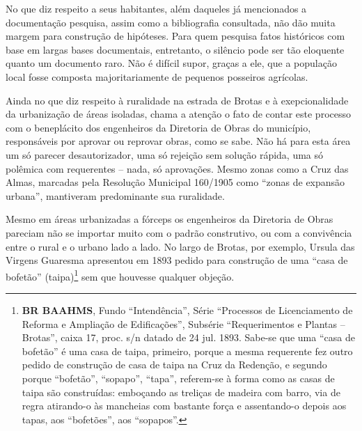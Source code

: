 
No que diz respeito a seus habitantes, além daqueles já mencionados a documentação pesquisa, assim como a bibliografia consultada, não dão muita margem para construção de hipóteses. Para quem pesquisa fatos históricos com base em largas bases documentais, entretanto, o silêncio pode ser tão eloquente quanto um documento raro. Não é difícil supor, graças a ele, que a população local fosse composta majoritariamente de pequenos posseiros agrícolas.


Ainda no que diz respeito à ruralidade na estrada de Brotas e à exepcionalidade da urbanização de áreas isoladas, chama a atenção o fato de contar este processo com o beneplácito dos engenheiros da Diretoria de Obras do município, responsáveis por aprovar ou reprovar obras, como se sabe. Não há para esta área um só parecer desautorizador, uma só rejeição sem solução rápida, uma só polêmica com requerentes -- nada, só aprovações. Mesmo zonas como a Cruz das Almas, marcadas pela Resolução Municipal 160/1905 como ``zonas de expansão urbana'', mantiveram predominante sua ruralidade.

Mesmo em áreas urbanizadas a fórceps os engenheiros da Diretoria de Obras pareciam não se importar muito com o padrão construtivo, ou com a convivência entre o rural e o urbano lado a lado. No largo de Brotas, por exemplo, Ursula das Virgens Guaresma apresentou em 1893 pedido para construção de uma ``casa de bofetão'' (taipa)\footnote{\textbf{BR BAAHMS}, Fundo ``Intendência'', Série ``Processos de Licenciamento de Reforma e Ampliação de Edificações'', Subsérie ``Requerimentos e Plantas -- Brotas'', caixa 17, proc. s/n datado de 24 jul. 1893. Sabe-se que uma ``casa de bofetão'' é uma casa de taipa, primeiro, porque a mesma requerente fez outro pedido de construção de casa de taipa na Cruz da Redenção, e segundo porque ``bofetão'', ``sopapo'', ``tapa'', referem-se à forma como as casas de taipa são construídas: emboçando as treliças de madeira com barro, via de regra atirando-o às mancheias com bastante força e assentando-o depois aos tapas, aos ``bofetões'', aos ``sopapos''.} sem que houvesse qualquer objeção.  


